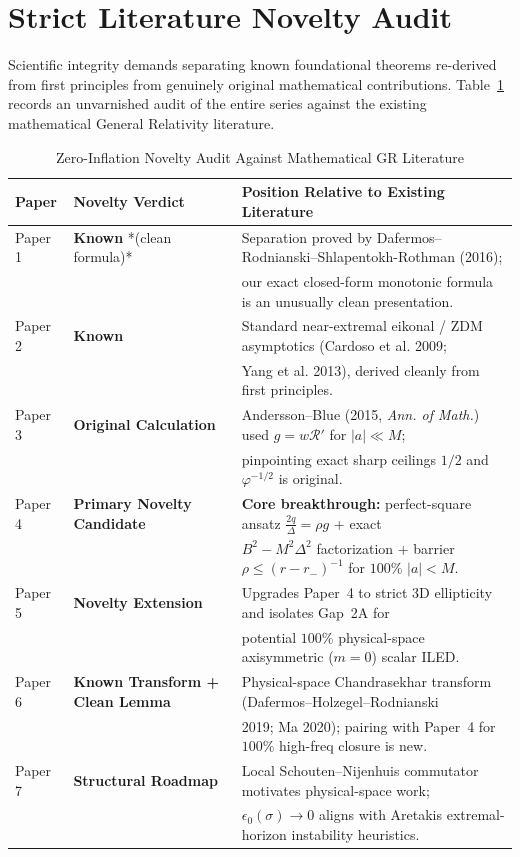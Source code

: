 \documentclass[11pt, a4paper]{article}
\theoremstyle{remark}
\begin{document}
\section{Strict Literature Novelty Audit}

Scientific integrity demands separating known foundational theorems re-derived from first principles from genuinely original mathematical contributions. Table~\ref{tab:novelty-audit} records an unvarnished audit of the entire series against the existing mathematical General Relativity literature.

\begin{table}[h]
\centering
\caption{Zero-Inflation Novelty Audit Against Mathematical GR Literature}
\label{tab:novelty-audit}
\begin{tabular}{@{}lll@{}}
\toprule
\textbf{Paper} & \textbf{Novelty Verdict} & \textbf{Position Relative to Existing Literature} \\
\midrule
Paper 1 & \textbf{Known} *(clean formula)* & Separation proved by Dafermos--Rodnianski--Shlapentokh-Rothman (2016); \\
 & & our exact closed-form monotonic formula is an unusually clean presentation. \\
\addlinespace[4pt]
Paper 2 & \textbf{Known} & Standard near-extremal eikonal / ZDM asymptotics (Cardoso et al. 2009; \\
 & & Yang et al. 2013), derived cleanly from first principles. \\
\addlinespace[4pt]
Paper 3 & \textbf{Original Calculation} & Andersson--Blue (2015, \emph{Ann. of Math.}) used $g = w\mathcal{R}'$ for $|a| \ll M$; \\
 & & pinpointing exact sharp ceilings $1/2$ and $\varphi^{-1/2}$ is original. \\
\addlinespace[4pt]
Paper 4 & \textbf{Primary Novelty Candidate} & \textbf{Core breakthrough:} perfect-square ansatz $\frac{2q}{\Delta} = \rho g$ + exact \\
 & & $B^2 - M^2\Delta^2$ factorization + barrier $\rho \le (r-r_-)^{-1}$ for $100\%$ $|a| < M$. \\
\addlinespace[4pt]
Paper 5 & \textbf{Novelty Extension} & Upgrades Paper~4 to strict 3D ellipticity and isolates Gap~2A for \\
 & & potential $100\%$ physical-space axisymmetric ($m=0$) scalar ILED. \\
\addlinespace[4pt]
Paper 6 & \textbf{Known Transform + Clean Lemma} & Physical-space Chandrasekhar transform (Dafermos--Holzegel--Rodnianski \\
 & & 2019; Ma 2020); pairing with Paper~4 for $100\%$ high-freq closure is new. \\
\addlinespace[4pt]
Paper 7 & \textbf{Structural Roadmap} & Local Schouten--Nijenhuis commutator motivates physical-space work; \\
 & & $\epsilon_0(\sigma) \to 0$ aligns with Aretakis extremal-horizon instability heuristics. \\
\bottomrule
\end{tabular}
\end{table}
\end{document}
